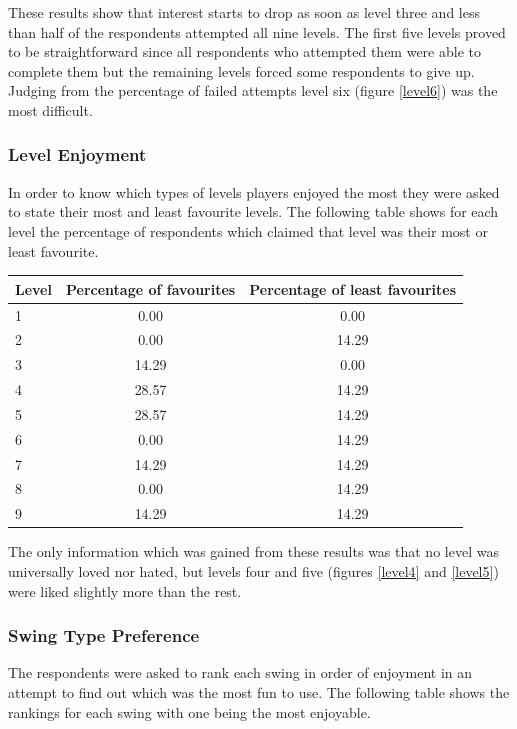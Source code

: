 \documentclass[]{report}
\begin{document}
			These results show that interest starts to drop as soon as level three and less than half of the respondents attempted all nine levels. The first five levels proved to be straightforward since all respondents who attempted them were able to complete them but the remaining levels forced some respondents to give up. Judging from the percentage of failed attempts level six (figure \ref{level6}) was the most difficult.
				
			\subsubsection{Level Enjoyment}
			In order to know which types of levels players enjoyed the most they were asked to state their most and least favourite levels. The following table shows for each level the percentage of respondents which claimed that level was their most or least favourite.
			
			\begin{tabular}[H]{ l || c | c }
				Level & Percentage of favourites & Percentage of least favourites \\
				\hline
		        1 & 0.00 & 0.00 \\
		        2 & 0.00 & 14.29 \\
		        3 & 14.29 & 0.00 \\
		        4 & 28.57 & 14.29 \\
		        5 & 28.57 & 14.29 \\
		        6 & 0.00 & 14.29 \\
		        7 & 14.29 & 14.29 \\
		        8 & 0.00 & 14.29 \\
		        9 & 14.29 & 14.29 \\
			\end{tabular}
			
			The only information which was gained from these results was that no level was universally loved nor hated, but levels four and five (figures \ref{level4} and \ref{level5}) were liked slightly more than the rest.
			
			\subsubsection{Swing Type Preference}
			The respondents were asked to rank each swing in order of enjoyment in an attempt to find out which was the most fun to use. The following table shows the rankings for each swing with one being the most enjoyable.
			
\end{document}
